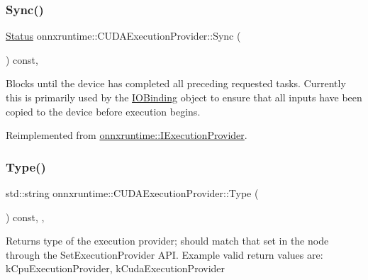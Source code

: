 \mbox{\label{classonnxruntime_1_1CUDAExecutionProvider_a4f3479126d1191bb1074c4b953b3ef87}} 
\subsubsection{\texorpdfstring{Sync()}{Sync()}}
{\footnotesize\ttfamily \mbox{\hyperlink{classonnxruntime_1_1common_1_1Status}{Status}} onnxruntime\+::\+C\+U\+D\+A\+Execution\+Provider\+::\+Sync (\begin{DoxyParamCaption}{ }\end{DoxyParamCaption}) const\hspace{0.3cm}{\ttfamily [override]}, {\ttfamily [virtual]}}

Blocks until the device has completed all preceding requested tasks. Currently this is primarily used by the \mbox{\hyperlink{classonnxruntime_1_1IOBinding}{I\+O\+Binding}} object to ensure that all inputs have been copied to the device before execution begins. 

Reimplemented from \mbox{\hyperlink{classonnxruntime_1_1IExecutionProvider_a3657d5ed274547507a7b99d466fa13ef}{onnxruntime\+::\+I\+Execution\+Provider}}.

\mbox{\label{classonnxruntime_1_1CUDAExecutionProvider_aba2225328bd739b5e6ef4be06557985b}} 
\subsubsection{\texorpdfstring{Type()}{Type()}}
{\footnotesize\ttfamily std\+::string onnxruntime\+::\+C\+U\+D\+A\+Execution\+Provider\+::\+Type (\begin{DoxyParamCaption}{ }\end{DoxyParamCaption}) const\hspace{0.3cm}{\ttfamily [inline]}, {\ttfamily [override]}, {\ttfamily [virtual]}}

\begin{DoxyReturn}{Returns}
type of the execution provider; should match that set in the node through the Set\+Execution\+Provider A\+PI. Example valid return values are\+: k\+Cpu\+Execution\+Provider, k\+Cuda\+Execution\+Provider 
\end{DoxyReturn}


